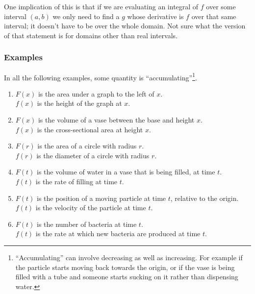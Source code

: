 One implication of this is that if we are evaluating an integral of $f$ over some interval $(a, b)$ we
only need to find a $g$ whose derivative is $f$ over that same interval; it doesn't have to be over the
whole domain. Not sure what the version of that statement is for domains other than real intervals.
\subsubsection*{Examples}

In all the following examples, some quantity is
``accumulating''\footnote{``Accumulating'' can involve decreasing as well as
  increasing. For example if the particle starts moving back towards the
  origin, or if the vase is being filled with a tube and someone starts sucking
  on it rather than dispensing water.}.

\begin{enumerate}
\item $F(x)$ is the area under a graph to the left of $x$.\\
  $f(x)$ is the height of the graph at $x$.\\

\item $F(x)$ is the volume of a vase between the base and height $x$. \\
  $f(x)$ is the cross-sectional area at height $x$.\\

\item $F(r)$ is the area of a circle with radius $r$.\\
  $f(r)$ is the diameter of a circle with radius $r$.\\

\item $F(t)$ is the volume of water in a vase that is being filled, at time $t$.\\
  $f(t)$ is the rate of filling at time $t$.\\

\item $F(t)$ is the position of a moving particle at time $t$, relative to the origin.\\
  $f(t)$ is the velocity of the particle at time $t$.\\

\item $F(t)$ is the number of bacteria at time $t$.\\
  $f(t)$ is the rate at which new bacteria are produced at time $t$.
\end{enumerate}

